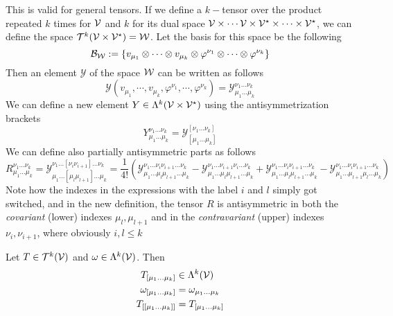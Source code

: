 \documentclass[../complete.tex]{subfiles}
\begin{document}
\begin{dfn}
	This is valid for general tensors. If we define a $k-$tensor over the product repeated $k$ times for $\mathcal{V}$ and $k$ for its dual space $\mathcal{V}\times\cdots\mathcal{V}\times\mathcal{V}^\star\times\cdots\times\mathcal{V}^\star$, we can define the space $\mathcal{T}^{k}(\mathcal{V}\times\mathcal{V}^\star)=\mathcal{W}$. Let the basis for this space be the following
	\begin{equation*}
		\mathcal{B}_{\mathcal{W}}:=\{v_{\mu_1}\otimes\cdots\otimes v_{\mu_k}\otimes\varphi^{\nu_1}\otimes\cdots\otimes\varphi^{\nu_k}\}
	\end{equation*}
	Then an element $\mathcal{Y}$ of the space $\mathcal{W}$ can be written as follows
	\begin{equation*}
		\mathcal{Y}(v_{\mu_1},\cdots,v_{\mu_k},\varphi^{\nu_1},\cdots,\varphi^{\nu_k})=\mathcal{Y}^{\nu_1\ldots\nu_k}_{\mu_1\ldots\mu_k}
	\end{equation*}
	We can define a new element $Y\in\Lambda^k(\mathcal{V}\times\mathcal{V}^\star)$ using the antisymmetrization brackets
	\begin{equation*}
		Y^{\nu_1\ldots\nu_k}_{\mu_1\ldots\mu_k}=\mathcal{Y}^{[\nu_1\ldots\nu_k]}_{[\mu_1\ldots\mu_k]}
	\end{equation*}
	We can define also partially antisymmetric parts as follows
	\begin{equation*}
		R^{\nu_1\ldots\nu_k}_{\mu_1\ldots\mu_k}=\mathcal{Y}^{\nu_1\ldots[\nu_i\nu_{i+1}]\ldots\nu_k}_{\mu_1\ldots[\mu_{l}\mu_{l+1}]\ldots\mu_k}=\frac{1}{4!}\left( \mathcal{Y}^{\nu_1\ldots\nu_i\nu_{i+1}\ldots\nu_k}_{\mu_1\ldots\mu_{l}\mu_{l+1}\ldots\mu_k}-\mathcal{Y}^{\nu_1\ldots\nu_{i+1}\nu_{i}\ldots\nu_k}_{\mu_1\ldots\mu_{l}\mu_{l+1}\ldots\mu_k}+\mathcal{Y}^{\nu_1\ldots\nu_i\nu_{i+1}\ldots\nu_k}_{\mu_1\ldots\mu_{l}\mu_{l+1}\ldots\mu_k}-\mathcal{Y}^{\nu_1\ldots\nu_i\nu_{i+1}\ldots\nu_k}_{\mu_1\ldots\mu_{l+1}\mu_{l}\ldots\mu_k} \right)
	\end{equation*}
	Note how the indexes in the expressions with the label $i$ and $l$ simply got switched, and in the new definition, the tensor $R$ is antisymmetric in both the \textit{covariant} (lower) indexes $\mu_l,\mu_{l+1}$ and in the \textit{contravariant} (upper) indexes $\nu_i,\nu_{i+1}$, where obviously $i,l\le k$
\end{dfn}
\begin{thm}
	Let $T\in\mathcal{T}^k(\mathcal{V})$ and $\omega\in\Lambda^k(\mathcal{V})$. Then
	\begin{equation}
		\begin{aligned}
			T_{[\mu_1\ldots\mu_k]}&\in\Lambda^k(\mathcal{V})\\
			\omega_{[\mu_1\ldots\mu_k]}&=\omega_{\mu_1\ldots\mu_k}\\
			T_{[[\mu_1\ldots\mu_k]]}&=T_{[\mu_1\ldots\mu_k]}
		\end{aligned}
		\label{eq:propalt}
	\end{equation}
\end{thm}
\end{document}
